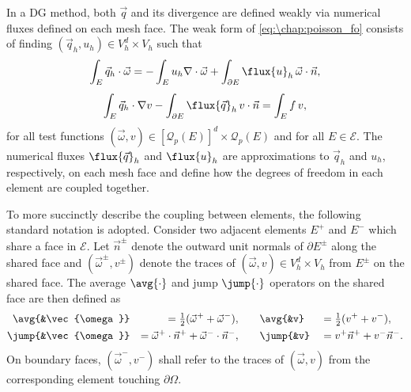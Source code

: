 In a DG method, both $\vec{q}$ and its divergence are defined weakly via numerical fluxes defined on each mesh face. The weak form of \cref{eq:\chap:poisson_fo} consists of finding $(\vec{q}_h,u_h) \in V_h^d \times V_h$ such that
\begin{gather}
\int_E \vec{q}_h \cdot \vec{\omega} = -\int_E u_h \nabla \cdot \vec{\omega} + \int_{\partial E} \flux{u}_h\,\vec{\omega} \cdot \vec{n}, \label{eq:\chap:grad_weak1} \\[0.4em]
\int_E \vec{q}_h \cdot \nabla v - \int_{\partial E} \flux{\vec{q}}_h\,v \cdot \vec{n} = \int_E f\,v, \label{eq:\chap:div_weak1}
\end{gather}
for all test functions $(\vec{\omega},v) \in [\mathcal{Q}_p(E)]^d \times \mathcal{Q}_p(E)$ and for all $E \in \mathcal{E}$. The numerical fluxes $\flux{\vec{q}}_h$ and $\flux{u}_h$ are approximations to $\vec{q}_h$ and $u_h$, respectively, on each mesh face and define how the degrees of freedom in each element are coupled together.


To more succinctly describe the coupling between elements, the following standard notation is adopted. Consider two adjacent elements $E^+$ and $E^-$ which share a face in $\mathcal{E}$. Let $\vec{n}^\pm$ denote the outward unit normals of $\partial E^\pm$ along the shared face and $(\vec{\omega}^\pm, v^\pm)$ denote the traces of $(\vec{\omega},v) \in V_h^d \times V_h$ from $E^\pm$ on the shared face. The average $\avg{\cdot}$ and jump $\jump{\cdot}$ operators on the shared face are then defined as
\begin{alignat*}{4}
\avg{&\vec{\omega}} &&= \tfrac12 (\vec{\omega}^+ + \vec{\omega}^-), &\qquad \avg{&v} &&= \tfrac12 (v^+ + v^-), \\
\jump{&\vec{\omega}} &&= \vec{\omega}^+ \cdot \vec{n}^+ + \vec{\omega}^- \cdot \vec{n}^-, &\qquad \jump{&v} &&= v^+ \vec{n}^+ + v^- \vec{n}^-.
\end{alignat*}
On boundary faces, $(\vec{\omega}^-, v^-)$ shall refer to the traces of $(\vec{\omega},v)$ from the corresponding element touching $\partial \Omega$.


